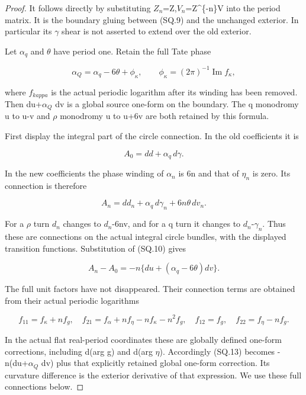 \begin{proof}
It follows directly by substituting \(Z_{n}\)=Z,\(V_{n}\)=Z\^{}\{-n\}V into the
period matrix. It is the boundary gluing between (SQ.9) and the
unchanged exterior. In particular its \(\gamma\) shear is not asserted to
extend over the old exterior.

Let \(\alpha_{q}\) and \(\theta\) have period one. Retain the full Tate phase

\[
 \alpha_Q=\alpha_q-6\theta+\phi_\kappa,
 \qquad \phi_\kappa=(2\pi)^{-1}\operatorname{Im}f_\kappa,
                                                        \tag{SQ.11}
\]

where \(f_{kappa}\) is the actual periodic logarithm after its winding has
been removed. Then du+\(\alpha_{Q}\) dv is a global source one-form on the
boundary. The q monodromy u to u-v and \(\rho\) monodromy u to u+6v
are both retained by this formula.

First display the integral part of the circle connection. In the
old coefficients it is

\[
 A_0=dd+\alpha_q\,d\gamma.
\]

In the new coefficients the phase winding of \(\alpha_{n}\) is 6n and
that of \(\eta_{n}\) is zero. Its connection is therefore

\[
 A_n=dd_n+\alpha_q\,d\gamma_n+6n\theta\,dv_n.
                                                        \tag{SQ.12}
\]

For a \(\rho\) turn \(d_{n}\) changes to \(d_{n}\)-6nv, and for a q turn it changes
to \(d_{n}\)-\(\gamma_{n}\). Thus these are connections on the actual integral
circle bundles, with the displayed transition functions. Substitution
of (SQ.10) gives

\[
 A_n-A_0=-n\{du+(\alpha_q-6\theta)dv\}.             \tag{SQ.13}
\]

The full unit factors have not disappeared. Their connection terms
are obtained from their actual periodic logarithms

\[
 f_{11}=f_\kappa+nf_g,\quad
 f_{21}=f_\alpha+nf_\eta-nf_\kappa-n^2f_g,\quad
 f_{12}=f_g,\quad f_{22}=f_\eta-nf_g.                \tag{SQ.14}
\]

In the actual flat real-period coordinates these are globally defined
one-form corrections, including d(arg g) and d(arg \(\eta\)). Accordingly
(SQ.13) becomes -n(du+\(\alpha_{Q}\) dv) plus that explicitly retained
global one-form correction. Its curvature difference is the exterior
derivative of that expression. We use these full connections below.


\end{proof}

